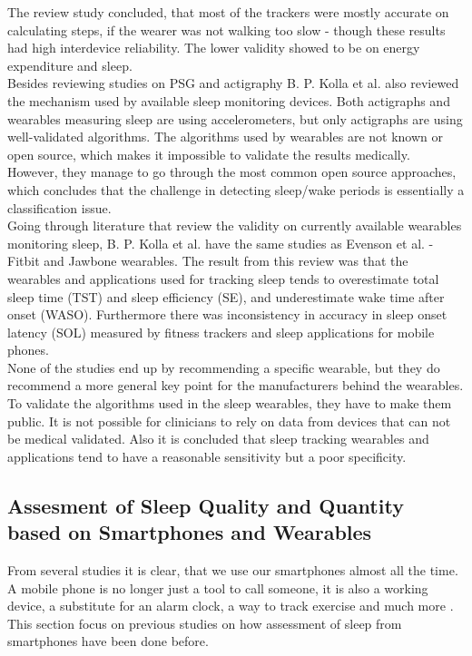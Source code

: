 \documentclass[12pt]{article} %
\begin{document}
The review study concluded, that most of the trackers were mostly accurate on calculating steps, if the wearer was not walking too slow - though these results had high interdevice reliability. The lower validity showed to be on energy expenditure and sleep.\\

Besides reviewing studies on PSG and actigraphy B. P. Kolla et al. also reviewed the mechanism used by available sleep monitoring devices. Both actigraphs and wearables measuring sleep are using accelerometers, but only actigraphs are using well-validated algorithms. The algorithms used by wearables are not known or open source, which makes it impossible to validate the results medically. However, they manage to go through the most common open source approaches, which concludes that the challenge in detecting sleep/wake periods is essentially a classification issue. \\

Going through literature that review the validity on currently available wearables monitoring sleep, B. P. Kolla et al. have the same studies as Evenson et al. - Fitbit and Jawbone wearables. The result from this review was that the wearables and applications used for tracking sleep tends to overestimate total sleep time (TST) and sleep efficiency (SE), and underestimate wake time after onset (WASO). Furthermore there was inconsistency in accuracy in sleep onset latency (SOL) measured by fitness trackers and sleep applications for mobile phones.\\

None of the studies end up by recommending a specific wearable, but they do recommend a more general key point for the manufacturers behind the wearables. To validate the algorithms used in the sleep wearables, they have to make them public. It is not possible for clinicians to rely on data from devices that can not be medical validated. Also it is concluded that sleep tracking wearables and applications tend to have a reasonable sensitivity but a poor specificity.  

\newpage
\subsection{Assesment of Sleep Quality and Quantity based on Smartphones and Wearables}
From several studies it is clear, that we use our smartphones almost all the time. A mobile phone is no longer just a tool to call someone, it is also a working device, a substitute for an alarm clock, a way to track exercise and much more \cite{dey-wac-ubicomp}. This section focus on previous studies on how assessment of sleep from smartphones have been done before. \\
\end{document}
